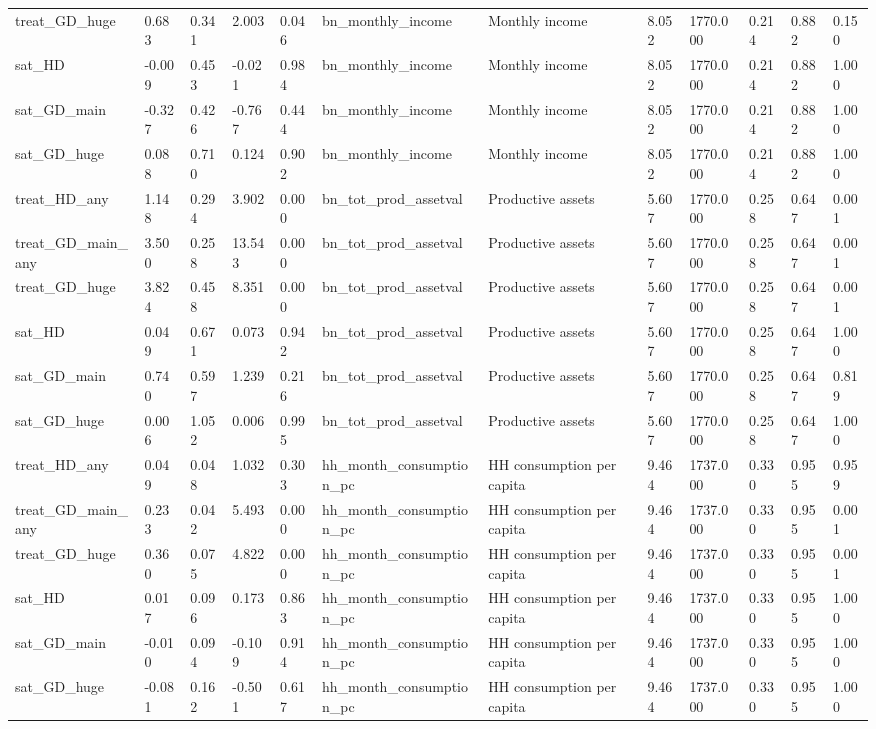 \begin{tabular}{llllllllllll}
treat\_GD\_huge & 0.683 & 0.341 & 2.003 & 0.046 & bn\_monthly\_income & Monthly income & 8.052 & 1770.000 & 0.214 & 0.882 & 0.150 \\
sat\_HD & -0.009 & 0.453 & -0.021 & 0.984 & bn\_monthly\_income & Monthly income & 8.052 & 1770.000 & 0.214 & 0.882 & 1.000 \\
sat\_GD\_main & -0.327 & 0.426 & -0.767 & 0.444 & bn\_monthly\_income & Monthly income & 8.052 & 1770.000 & 0.214 & 0.882 & 1.000 \\
sat\_GD\_huge & 0.088 & 0.710 & 0.124 & 0.902 & bn\_monthly\_income & Monthly income & 8.052 & 1770.000 & 0.214 & 0.882 & 1.000 \\
treat\_HD\_any & 1.148 & 0.294 & 3.902 & 0.000 & bn\_tot\_prod\_assetval & Productive assets & 5.607 & 1770.000 & 0.258 & 0.647 & 0.001 \\
treat\_GD\_main\_any & 3.500 & 0.258 & 13.543 & 0.000 & bn\_tot\_prod\_assetval & Productive assets & 5.607 & 1770.000 & 0.258 & 0.647 & 0.001 \\
treat\_GD\_huge & 3.824 & 0.458 & 8.351 & 0.000 & bn\_tot\_prod\_assetval & Productive assets & 5.607 & 1770.000 & 0.258 & 0.647 & 0.001 \\
sat\_HD & 0.049 & 0.671 & 0.073 & 0.942 & bn\_tot\_prod\_assetval & Productive assets & 5.607 & 1770.000 & 0.258 & 0.647 & 1.000 \\
sat\_GD\_main & 0.740 & 0.597 & 1.239 & 0.216 & bn\_tot\_prod\_assetval & Productive assets & 5.607 & 1770.000 & 0.258 & 0.647 & 0.819 \\
sat\_GD\_huge & 0.006 & 1.052 & 0.006 & 0.995 & bn\_tot\_prod\_assetval & Productive assets & 5.607 & 1770.000 & 0.258 & 0.647 & 1.000 \\
treat\_HD\_any & 0.049 & 0.048 & 1.032 & 0.303 & hh\_month\_consumption\_pc & HH consumption per capita & 9.464 & 1737.000 & 0.330 & 0.955 & 0.959 \\
treat\_GD\_main\_any & 0.233 & 0.042 & 5.493 & 0.000 & hh\_month\_consumption\_pc & HH consumption per capita & 9.464 & 1737.000 & 0.330 & 0.955 & 0.001 \\
treat\_GD\_huge & 0.360 & 0.075 & 4.822 & 0.000 & hh\_month\_consumption\_pc & HH consumption per capita & 9.464 & 1737.000 & 0.330 & 0.955 & 0.001 \\
sat\_HD & 0.017 & 0.096 & 0.173 & 0.863 & hh\_month\_consumption\_pc & HH consumption per capita & 9.464 & 1737.000 & 0.330 & 0.955 & 1.000 \\
sat\_GD\_main & -0.010 & 0.094 & -0.109 & 0.914 & hh\_month\_consumption\_pc & HH consumption per capita & 9.464 & 1737.000 & 0.330 & 0.955 & 1.000 \\
sat\_GD\_huge & -0.081 & 0.162 & -0.501 & 0.617 & hh\_month\_consumption\_pc & HH consumption per capita & 9.464 & 1737.000 & 0.330 & 0.955 & 1.000 \\
\bottomrule
\end{tabular}

